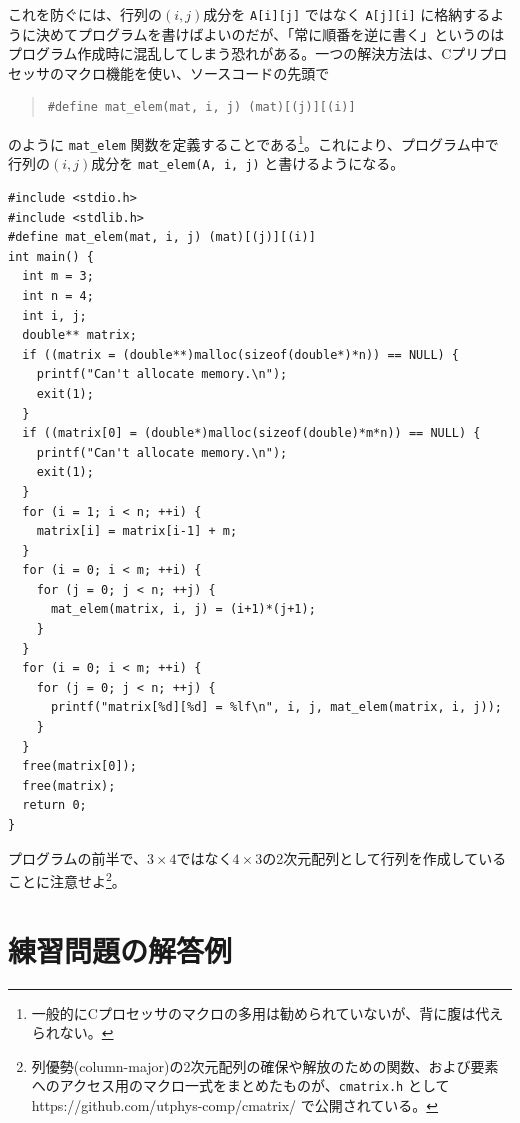 これを防ぐには、行列の$(i,j)$成分を \verb|A[i][j]| ではなく \verb|A[j][i]| に格納するように決めてプログラムを書けばよいのだが、「常に順番を逆に書く」というのはプログラム作成時に混乱してしまう恐れがある。一つの解決方法は、Cプリプロセッサのマクロ機能を使い、ソースコードの先頭で
\begin{quote}
\begin{verbatim}
#define mat_elem(mat, i, j) (mat)[(j)][(i)]
\end{verbatim}
\end{quote}
のように \verb|mat_elem| 関数を定義することである\footnote{一般的にCプロセッサのマクロの多用は勧められていないが、背に腹は代えられない。}。これにより、プログラム中で行列の$(i,j)$成分を \verb|mat_elem(A, i, j)| と書けるようになる。
\begin{reidai}\label{ex:malloc-2dim-column-major}
\begin{verbatim}
#include <stdio.h>
#include <stdlib.h>
#define mat_elem(mat, i, j) (mat)[(j)][(i)]
int main() {
  int m = 3;
  int n = 4;
  int i, j;
  double** matrix;
  if ((matrix = (double**)malloc(sizeof(double*)*n)) == NULL) {
    printf("Can't allocate memory.\n");
    exit(1);
  }
  if ((matrix[0] = (double*)malloc(sizeof(double)*m*n)) == NULL) {
    printf("Can't allocate memory.\n");
    exit(1);
  }
  for (i = 1; i < n; ++i) {
    matrix[i] = matrix[i-1] + m;
  }
  for (i = 0; i < m; ++i) {
    for (j = 0; j < n; ++j) {
      mat_elem(matrix, i, j) = (i+1)*(j+1);
    }
  }
  for (i = 0; i < m; ++i) {
    for (j = 0; j < n; ++j) {
      printf("matrix[%d][%d] = %lf\n", i, j, mat_elem(matrix, i, j));
    }
  }
  free(matrix[0]);
  free(matrix);
  return 0;
}
\end{verbatim}
\end{reidai} \noindent
プログラムの前半で、$3 \times 4$ではなく$4 \times 3$の2次元配列として行列を作成していることに注意せよ\footnote{列優勢(column-major)の2次元配列の確保や解放のための関数、および要素へのアクセス用のマクロ一式をまとめたものが、{\tt cmatrix.h} として https://github.com/utphys-comp/cmatrix/ で公開されている。}。

\section{練習問題の解答例}

